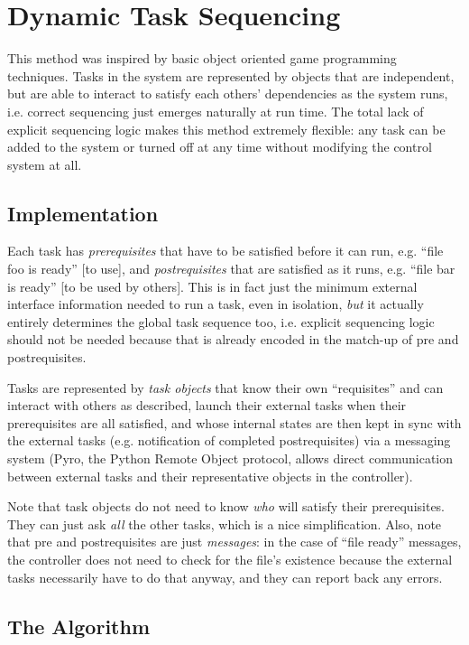 \documentclass[12pt]{article}
\begin{document}
\section{Dynamic Task Sequencing}

This method was inspired by basic object oriented game programming
techniques. Tasks in the system are represented by objects that are
independent, but are able to interact to satisfy each others'
dependencies as the system runs, i.e. correct sequencing just emerges
naturally at run time. The total lack of explicit sequencing logic makes
this method extremely flexible: any task can be added to the system or
turned off at any time without modifying the control system at all.


\subsection{Implementation}

Each task has {\em prerequisites} that have to be satisfied before it
can run, e.g. ``file foo is ready'' [to use], and {\em postrequisites}
that are satisfied as it runs, e.g. ``file bar is ready'' [to be used by
others]. This is in fact just the minimum external interface information
needed to run a task, even in isolation, {\em but} it actually entirely
determines the global task sequence too, i.e. explicit sequencing logic
should not be needed because that is already encoded in the match-up of
pre and postrequisites. 

Tasks are represented by {\em task objects} that know their own
``requisites'' and can interact with others as described, launch their
external tasks when their prerequisites are all satisfied, and whose
internal states are then kept in sync with the external tasks (e.g.
notification of completed postrequisites) via a messaging system (Pyro,
the Python Remote Object protocol, allows direct communication between
external tasks and their representative objects in the controller). 

Note that task objects do not need to know {\em who} will satisfy their
prerequisites. They can just ask {\em all} the other tasks, which is a
nice simplification. Also, note that pre and postrequisites are just {\em
messages}: in the case of ``file ready'' messages, the controller does
not need to check for the file's existence because the external tasks
necessarily have to do that anyway, and they can report back any errors.


\subsection{The Algorithm}
\end{document}
